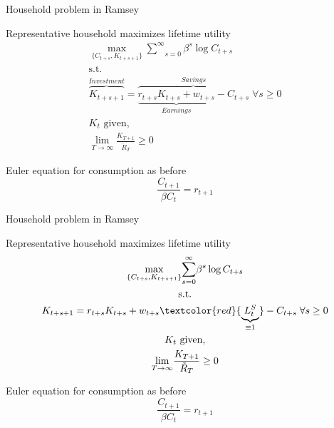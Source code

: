 
\begin{frame}{Household problem in Ramsey}

Representative household maximizes lifetime utility
\begin{gather*}
\underset{\{C_{t+s},K_{t+s+1}\}}{\max }\underset{s=0}{\overset{\infty }{\sum}}\beta ^{s}\log C_{t+s} \\
\text{s.t.} \\
\overbrace{K_{t+s+1}}^{Investment}=\overbrace{\underbrace{r_{t+s}K_{t+s}+w_{t+s}}_{Earnings}- C_{t+s}}^{Savings} \; \forall s\geq 0 \\
K_{t}\text{ given,} \\
\underset{T\rightarrow \infty }{\lim }\frac{K_{T+1}}{\tilde{R}_{T}}\geq 0
\end{gather*}

Euler equation for consumption as before
\begin{equation*}
\frac{C_{t+1}}{\beta C_{t}}=r_{t+1}
\end{equation*}

\end{frame}


\begin{frame}{Household problem in Ramsey}

Representative household maximizes lifetime utility
\begin{gather*}
\underset{\{C_{t+s},K_{t+s+1}\}}{\max }\underset{s=0}{\overset{\infty }{\sum}}\beta ^{s}\log C_{t+s} \\
\text{s.t.} \\
K_{t+s+1}=r_{t+s}K_{t+s}+w_{t+s} \textcolor{red}{\underbrace{L_{t}^{S}}_{\equiv 1}}- C_{t+s} \; \forall s\geq 0 \\
K_{t}\text{ given,} \\
\underset{T\rightarrow \infty }{\lim }\frac{K_{T+1}}{\tilde{R}_{T}}\geq 0
\end{gather*}

Euler equation for consumption as before
\begin{equation*}
\frac{C_{t+1}}{\beta C_{t}}=r_{t+1}
\end{equation*}

\end{frame}


